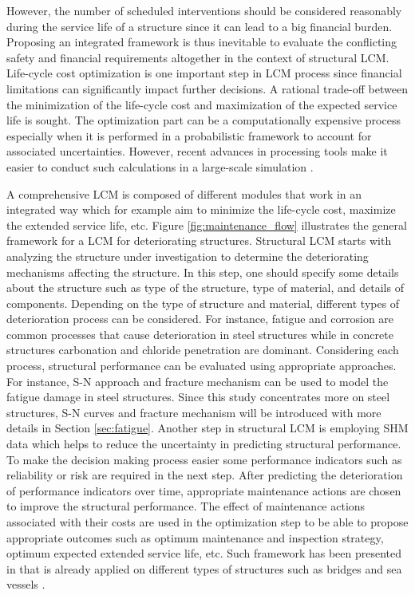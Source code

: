 However, the number of scheduled interventions should be considered reasonably during the service life of a structure since it can lead to a big financial burden. Proposing an integrated
framework is thus inevitable to evaluate the conflicting safety and financial requirements altogether in the context of structural LCM. Life-cycle cost optimization is one
important step in LCM process since financial limitations can significantly impact further decisions. A rational trade-off between the minimization of the life-cycle cost and maximization 
of the expected service life is sought. The optimization part can be a computationally expensive process especially when it is performed in a probabilistic framework to account for associated 
uncertainties. However, recent advances in processing tools make it easier to conduct such calculations in a large-scale simulation \citep{Okasha2010, Okasha2011}. 

A comprehensive LCM is composed of different modules that work in an integrated way which for example aim to minimize the life-cycle cost, maximize the extended service life, etc. 
Figure \ref{fig:maintenance_flow} illustrates the general framework for a LCM for deteriorating structures. Structural LCM starts with analyzing the structure under investigation to determine
the deteriorating mechanisms affecting the structure. 
In this step, one should specify some details about the structure such as type of the structure, type of material, and details of components. Depending on the type of structure and material,
different types of deterioration process can be considered. For instance, fatigue and corrosion are common processes that cause deterioration in steel structures while in concrete structures
carbonation and chloride penetration are dominant. Considering each process, structural performance can be evaluated using appropriate approaches. For instance, S-N approach and fracture 
mechanism can be used to model the fatigue damage in steel structures. Since this study concentrates more on steel structures, S-N curves and fracture mechanism will be introduced with more details in Section
\ref{sec:fatigue}. Another step in structural LCM is employing SHM data which helps to reduce the uncertainty in predicting structural performance. To make the decision making process easier some 
performance indicators such as reliability or risk are required in the next step. After predicting the deterioration of performance indicators over time, appropriate maintenance actions are 
chosen to improve the structural performance. The effect of maintenance actions associated with their costs are used in the optimization step to be able to propose appropriate outcomes such 
as optimum maintenance and inspection strategy, optimum expected extended service life, etc. Such framework has been presented in 
\citet{Frang2011, Frang2012, Miyamoto2015} that is already applied on different types of structures such as bridges \citep{KIM20111, KIM2012, KWON2011, Nader2010} and sea vessels 
\citep{KIM2011, Kim201111, kwon2012, Kwon20122}. 

